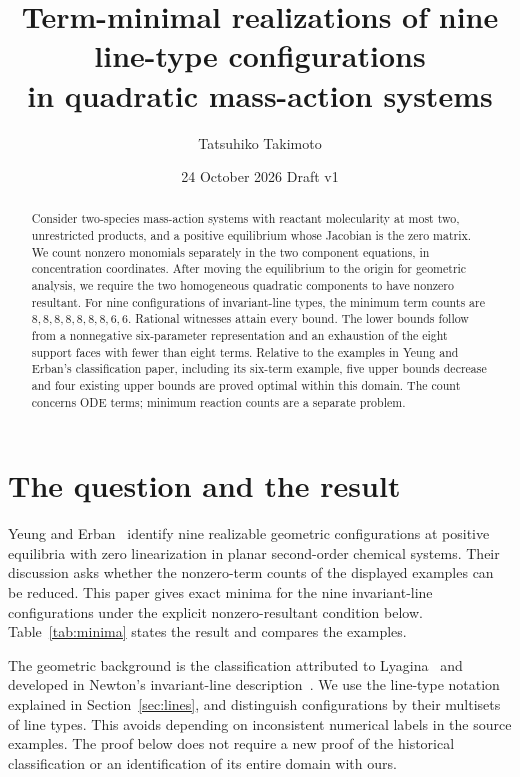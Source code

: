 \documentclass[11pt,a4paper]{article}
\title{Term-minimal realizations of nine line-type configurations\protect\\in quadratic mass-action systems}
\author{Tatsuhiko Takimoto}
\date{24 October 2026 \quad Draft v1}
\theoremstyle{definition}\newtheorem{definition}[theorem]{Definition}
\begin{document}
\maketitle
\begin{abstract}
Consider two-species mass-action systems with reactant molecularity at most two,
unrestricted products, and a positive equilibrium whose Jacobian is the zero
matrix. We count nonzero monomials separately in the two component equations,
in concentration coordinates. After moving the equilibrium to the origin for
geometric analysis, we require the two homogeneous quadratic components to have
nonzero resultant. For nine configurations of invariant-line types, the minimum
term counts are $8,8,8,8,8,8,8,6,6$. Rational witnesses attain every bound.
The lower bounds follow from a nonnegative six-parameter representation and an
exhaustion of the eight support faces with fewer than eight terms. Relative to
the examples in Yeung and Erban's classification paper, including its six-term
example, five upper bounds decrease and four existing upper bounds are proved
optimal within this domain. The count concerns ODE terms; minimum reaction
counts are a separate problem.
\end{abstract}

\section{The question and the result}
Yeung and Erban~\cite{YE} identify nine realizable geometric configurations at
positive equilibria with zero linearization in planar second-order chemical
systems. Their discussion asks whether the nonzero-term counts of the displayed
examples can be reduced. This paper gives exact minima for the nine
invariant-line configurations under the explicit nonzero-resultant condition
below. Table~\ref{tab:minima} states the result and compares the examples.

The geometric background is the classification attributed to
Lyagina~\cite{Lyagina} and developed in Newton's invariant-line
description~\cite{Newton}. We use the line-type notation explained in
Section~\ref{sec:lines}, and distinguish configurations by their multisets of
line types. This avoids depending on inconsistent numerical labels in the
source examples. The proof below does not require a new proof of the historical
classification or an identification of its entire domain with ours.
\end{document}
